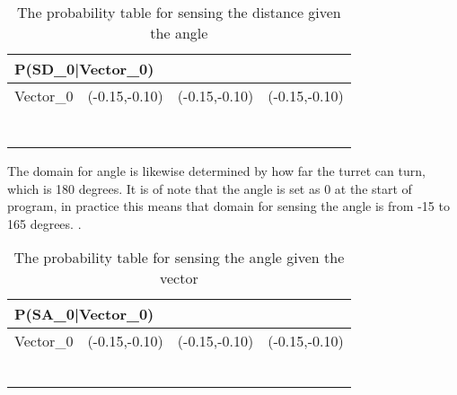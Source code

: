 \begin{center}
\begin{table}[]
\label{SD_table}
\begin{tabular}{|l|l|l|l|}
\hline
\multicolumn{4}{|l|}{P(SD\_0|Vector\_0)} \\ \hline
Vector\_0     & (-0.15,-0.10) & (-0.15,-0.10)    & (-0.15,-0.10)  \\\hline   
[0 - 75]      &     &     &     \\ \hline 
[76 - 100]    &     &     &     \\ \hline
[101 - 125]   &     &     &     \\ \hline
[126 - 150]   &     &     &     \\ \hline
[151 - 175]   &     &     &     \\ \hline
[176 - 200]   &     &     &     \\ \hline
[201 - 255]   &     &     &     \\ \hline
\end{tabular}
\caption{The probability table for sensing the distance given the angle}
\end{table}
\end{center}

The domain for angle is likewise determined by how far the turret can turn,
which is 180 degrees. It is of note that the angle is set as 0 at the start of
program, in practice this means that domain for sensing the angle is from -15 to
165 degrees. . 

\begin{center}
\begin{table}[]
\label{SA_table}
\begin{tabular}{|l|l|l|l|}
\hline
\multicolumn{4}{|l|}{P(SA\_0|Vector\_0)} \\ \hline
Vector\_0     & (-0.15,-0.10) & (-0.15,-0.10)    & (-0.15,-0.10)  \\\hline   
[-15 - 15]      &     &     &     \\ \hline 
[16 - 45]    &     &     &     \\ \hline
[46 - 75]   &     &     &     \\ \hline
[76 - 105]   &     &     &     \\ \hline
[106 - 135]   &     &     &     \\ \hline
[136 - 165]   &     &     &     \\ \hline
\end{tabular}
\caption{The probability table for sensing the angle given the vector}
\end{table}
\end{center}

